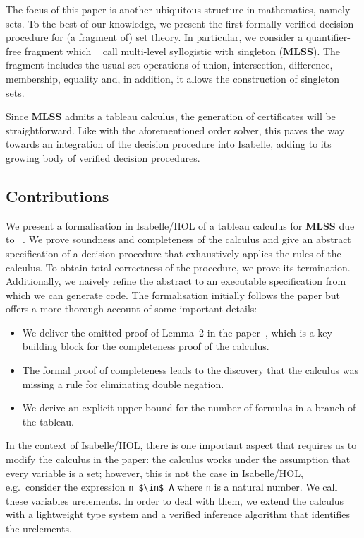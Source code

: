 \documentclass[runningheads]{llncs}
\newcommand{\MLSS}{\textbf{MLSS}}
\begin{document}
The focus of this paper is another ubiquitous structure in mathematics, namely sets.
To the best of our knowledge, we present the first formally verified decision procedure for (a fragment of) set theory.
In particular, we consider a quantifier-free fragment which \citeauthor{new_fast_tableau}~\cite{new_fast_tableau} call multi-level syllogistic with singleton (\MLSS{}).
The fragment includes the usual set operations of union, intersection, difference, membership, equality and, in addition, it allows the construction of singleton sets.

Since \MLSS{} admits a tableau calculus, the generation of certificates will be straightforward.
Like with the aforementioned order solver, this paves the way towards an integration of the decision procedure into Isabelle, adding to its growing body of verified decision procedures.

\subsection{Contributions}
We present a formalisation in Isabelle/HOL of a tableau calculus for \MLSS{} due to \citeauthor{new_fast_tableau}~\cite{new_fast_tableau}\cite[Chapter 14]{set_theory}.
We prove soundness and completeness of the calculus and give an abstract specification of a decision procedure that exhaustively applies the rules of the calculus.
To obtain total correctness of the procedure, we prove its termination.
Additionally, we naively refine the abstract to an executable specification from which we can generate code.
The formalisation initially follows the paper but offers a more thorough account of some important details:
\begin{itemize}
  \item We deliver the omitted proof of Lemma~2 in the paper~\cite{new_fast_tableau}, which is a key building block for the completeness proof of the calculus.
  \item The formal proof of completeness leads to the discovery that the calculus was missing a rule for eliminating double negation. 
  \item We derive an explicit upper bound for the number of formulas in a branch of the tableau.
\end{itemize}

In the context of Isabelle/HOL, there is one important aspect that requires us to modify the calculus in the paper:
the calculus works under the assumption that every variable is a set;
however, this is not the case in Isabelle/HOL, e.g.\ consider the expression \lstinline!n $\in$ A! where \lstinline!n! is a natural number.
We call these variables urelements.
In order to deal with them, we extend the calculus with a lightweight type system and a verified inference algorithm that identifies the urelements.
\end{document}
